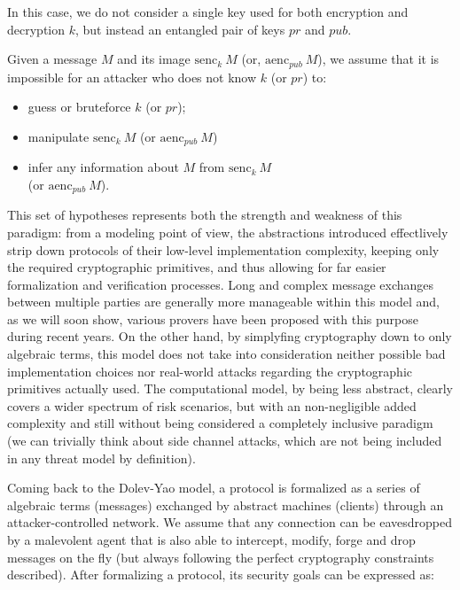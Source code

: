 \documentclass{article}
\newcounter{definition}[section]\setcounter{definition}{0}
\begin{document}
In this case, we do not consider a single key used for both encryption and decryption $k$, but instead an entangled pair of keys $pr$ and $pub$.

Given a message $M$ and its image $\textrm{senc}_k\ M$ (or, $\textrm{aenc}_{pub}\ M$), we assume that it is impossible for an attacker who does not know $k$ (or $pr$) to:

\begin{itemize}
    \item guess or bruteforce $k$ (or $pr$);
    \item manipulate $\textrm{senc}_k\ M$ (or $\textrm{aenc}_{pub}\ M$)
    \item infer any information about $M$ from $\textrm{senc}_k\ M$ \\(or $\textrm{aenc}_{pub}\ M$).
\end{itemize}

This set of hypotheses represents both the strength and weakness of this paradigm: from a modeling point of view, the abstractions introduced effectlively strip down protocols of their low-level implementation complexity, keeping only the required cryptographic primitives, and thus allowing for far easier formalization and verification processes. Long and complex message exchanges between multiple parties are generally more manageable within this model and, as we will soon show, various provers have been proposed with this purpose during recent years. On the other hand, by simplyfing cryptography down to only algebraic terms, this model does not take into consideration neither possible bad implementation choices nor real-world attacks regarding the cryptographic primitives actually used. The computational model, by being less abstract, clearly covers a wider spectrum of risk scenarios, but with an non-negligible added complexity and still without being considered a completely inclusive paradigm (we can trivially think about side channel attacks, which are not being included in any threat model by definition).

Coming back to the Dolev-Yao model, a protocol is formalized as a series of algebraic terms (messages) exchanged by abstract machines (clients) through an attacker-controlled network. We assume that any connection can be eavesdropped by a malevolent agent that is also able to intercept, modify, forge and drop messages on the fly (but always following the perfect cryptography constraints described). After formalizing a protocol, its security goals can be expressed as:
\end{document}
